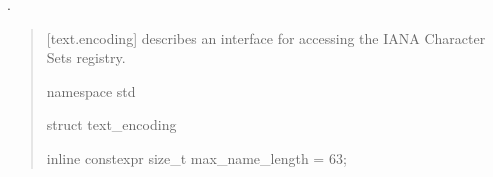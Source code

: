 \documentclass{wg21}
\begin{document}
.

\begin{quote}
\begin{addedblock}

[text.encoding] describes an interface for accessing the IANA Character Sets registry.



\begin{codeblock}

namespace std {

struct text_encoding {

    inline constexpr size_t max_name_length = 63;

}}
\end{codeblock}
\end{addedblock}
\end{quote}
\end{document}
